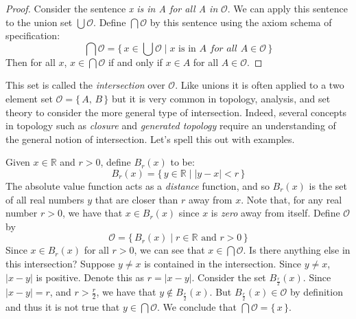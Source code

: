             \begin{proof}
                Consider the sentence \textit{x is in A for all A in}
                $\mathcal{O}$. We can apply this sentence to the union set
                $\bigcup\mathcal{O}$. Define $\bigcap\mathcal{O}$ by this
                sentence using the axiom schema of specification:
                \begin{equation}
                    \bigcap\mathcal{O}=\{\,x\in\bigcup\mathcal{O}\;|\;
                        x\textrm{ is in }A
                        \textit{ for all }A\in\mathcal{O}\,\}
                \end{equation}
                Then for all $x$, $x\in\bigcap\mathcal{O}$ if and only if
                $x\in{A}$ for all $A\in\mathcal{O}$.
            \end{proof}
            This set is called the \textit{intersection} over $\mathcal{O}$.%
            Like unions it is often applied to a two element set
            $\mathcal{O}=\{\,A,\,B\,\}$ but it is very common in topology,
            analysis, and set theory to consider the more general type of
            intersection. Indeed, several concepts in topology such as
            \textit{closure} and \textit{generated topology} require an
            understanding of the general notion of intersection. Let's spell
            this out with examples.
            \begin{example}
                Given $x\in\mathbb{R}$ and $r>0$, define $B_{r}(x)$ to
                be:
                \begin{equation}
                    B_{r}(x)=\{\,y\in\mathbb{R}\;|\;|y-x|<r\,\}
                \end{equation}
                The absolute value function acts as a
                \textit{distance} function, and so $B_{r}(x)$ is the set of
                all real numbers $y$ that are closer than $r$ away from $x$.
                Note that, for any real number $r>0$, we have that
                $x\in{B}_{r}(x)$ since $x$ is \textit{zero} away from itself.
                Define $\mathcal{O}$ by
                \begin{equation}
                    \mathcal{O}=\{\,B_{r}(x)\;|\;r\in\mathbb{R}\textrm{ and }
                        r>0\,\}
                \end{equation}
                Since $x\in{B}_{r}(x)$ for all $r>0$, we can see that
                $x\in\bigcap\mathcal{O}$. Is there anything else in this
                intersection? Suppose $y\ne{x}$ is contained in the
                intersection. Since $y\ne{x}$, $|x-y|$ is positive. Denote this
                as $r=|x-y|$. Consider the set $B_{\frac{r}{2}}(x)$. Since
                $|x-y|=r$, and $r>\frac{r}{2}$, we have that
                $y\notin{B}_{\frac{r}{2}}(x)$. But
                $B_{\frac{r}{2}}(x)\in\mathcal{O}$ by definition and thus it
                is not true that $y\in\bigcap\mathcal{O}$. We conclude that
                $\bigcap\mathcal{O}=\{\,x\,\}$.
            \end{example}
